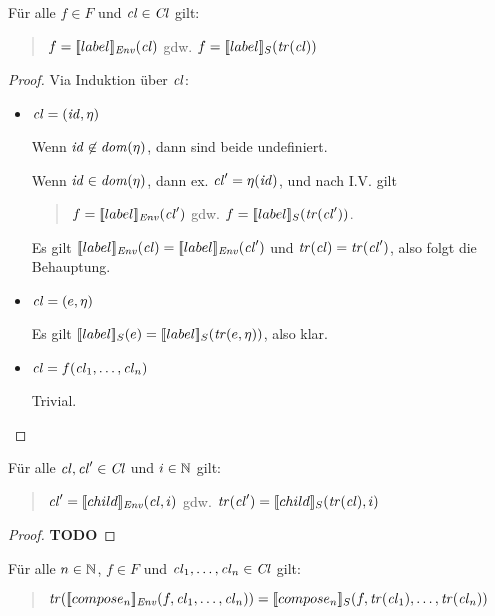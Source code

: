 \documentclass[12pt,a4paper]{article}
\begin{document}
\begin{lemma}
  F\"ur alle $f \in F$ und $\mathit{cl} \in \mathit{Cl}$ gilt:
  \begin{quote}
  $f = [\![label]\!]_{\mathit{Env}}(\mathit{cl})$ gdw. $f = [\![label]\!]_S(\mathit{tr}(\mathit{cl}))$
  \end{quote}
\end{lemma}

\begin{proof}
  Via Induktion \"uber $\mathit{cl}$:
  \begin{itemize}
  \item $\mathit{cl} = (\mathit{id},\eta)$

    Wenn $\mathit{id} \not\in \mathit{dom}(\eta)$, dann sind beide undefiniert.

    Wenn $\mathit{id} \in \mathit{dom}(\eta)$, dann ex. $\mathit{cl}' = \eta(\mathit{id})$, und nach I.V. gilt
    \begin{quote}
      $f = [\![label]\!]_{\mathit{Env}}(\mathit{cl}')$ gdw. $f = [\![label]\!]_S(\mathit{tr}(\mathit{cl}'))$.
    \end{quote}
    Es gilt $[\![label]\!]_{\mathit{Env}}(\mathit{cl}) = [\![label]\!]_{\mathit{Env}}(\mathit{cl}')$ und
    $\mathit{tr}(\mathit{cl}) = \mathit{tr}(\mathit{cl}')$, also folgt die Behauptung.

  \item $\mathit{cl} = (e,\eta)$

    Es gilt $[\![label]\!]_S(e) = [\![label]\!]_S(\mathit{tr}(e,\eta))$, also klar.

  \item $\mathit{cl} = f(\mathit{cl}_1,\ldots,\mathit{cl}_n)$

    Trivial.

  \end{itemize}
\end{proof}

\begin{lemma}
  F\"ur alle $\mathit{cl},\mathit{cl}' \in \mathit{Cl}$ und $i \in \mathbb N$ gilt:
  \begin{quote}
    $\mathit{cl}' = [\![child]\!]_{\mathit{Env}}(\mathit{cl},i)$ gdw. $\mathit{tr}(\mathit{cl}') = [\![child]\!]_S(\mathit{tr}(\mathit{cl}),i)$
  \end{quote}
\end{lemma}

\begin{proof}
  \textbf{TODO}
\end{proof}

\begin{lemma}
  F\"ur alle $n \in \mathbb N$, $f \in F$ und $\mathit{cl}_1,\ldots,\mathit{cl}_n \in \mathit{Cl}$ gilt:
  \begin{quote}
    $\mathit{tr}([\![compose_n]\!]_{\mathit{Env}}(f,\mathit{cl}_1,\ldots,\mathit{cl}_n)) = [\![compose_n]\!]_S(f,\mathit{tr}(\mathit{cl}_1),\ldots,\mathit{tr}(\mathit{cl}_n))$
  \end{quote}
\end{lemma}
\end{document}
